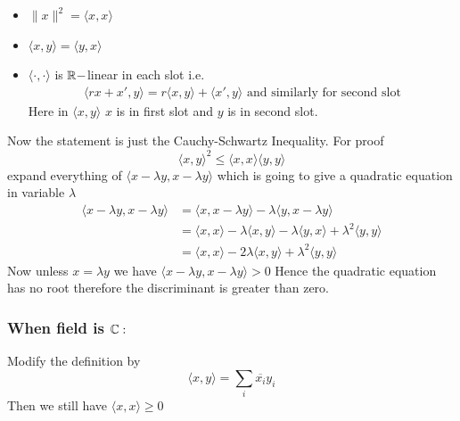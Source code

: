 \documentclass[12pt]{report}
\begin{document}
{    	\begin{note}
    		\begin{itemize}
    			\item $\|x\|^2=\langle x,x\rangle$
    			\item $\langle x,y\rangle=\langle y,x\rangle$
    			\item $\langle \cdot,\cdot\rangle$ is $\mathbb{R}-$linear in each slot i.e. \begin{align*}
    				      \langle rx+x',y\rangle=r\langle x,y\rangle+\langle x',y\rangle	\text{ and similarly for second slot}
    			      \end{align*}Here in $\langle x,y\rangle$ $x$ is in first slot and $y$ is in second slot.
    		\end{itemize}
    	\end{note}Now the statement is just the Cauchy-Schwartz Inequality. For proof $$\langle x,y\rangle^2\leq \langle x,x\rangle\langle y,y\rangle $$ expand everything of $\langle x-\lambda y,x-\lambda y\rangle$ which is going to give a quadratic equation in variable $\lambda $ \begin{align*}
    		\langle x-\lambda y,x-\lambda y\rangle & =\langle x,x-\lambda y\rangle-\lambda\langle y,x-\lambda y\rangle                                       \\
    		                                       & =\langle x ,x\rangle -\lambda\langle x,y\rangle -\lambda\langle y,x\rangle +\lambda^2\langle y,y\rangle \\
    		                                       & =\langle x,x\rangle -2\lambda\langle x,y\rangle+\lambda^2\langle y,y\rangle
    	\end{align*}Now unless $x=\lambda y$ we have $\langle x-\lambda y,x-\lambda y\rangle>0$ Hence the quadratic equation has no root therefore the discriminant is greater than zero.
    
    	\subsubsection*{\textbf{When field is $\mathbb{C}:$}}Modify the definition by $$\langle x,y\rangle=\sum_i\overline{x_i}y_i$$Then we still have $\langle x,x\rangle\geq 0$}
     \pagebreak
    
    
    
    
\end{document}

